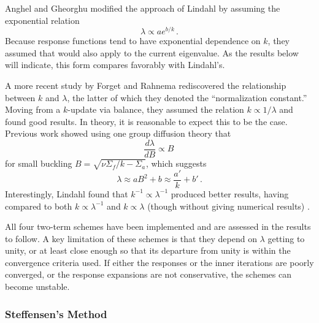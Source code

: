 Anghel and Gheorghu \cite{anghel1987isr}
modified the approach of Lindahl by assuming the 
exponential relation
\begin{equation}
  \lambda \propto a e^{b/k} \, .
\end{equation}
Because response functions tend to have exponential dependence on 
$k$, they assumed that would also apply to the current eigenvalue.  As the
results below will indicate, this form compares favorably with Lindahl's.

A more recent study by Forget and Rahnema \cite{forget2005nee} 
rediscovered the relationship
between $k$ and $\lambda$, the latter of which they denoted
the ``normalization constant.'' 
Moving from a $k$-update via balance, they assumed the relation 
$k \propto 1/\lambda$ and found good results.  In theory, it
is reasonable to expect
this to be the case.  Previous work \cite{roberts2014cer} showed 
using one group diffusion theory that 
\begin{equation}
 \frac{d \lambda}{d B} \propto  B \, 
\end{equation}
for small
buckling $B = \sqrt{\nu \Sigma_f/k - \Sigma_a}$, which
suggests
\begin{equation}
 \lambda \approx  a B^2 + b \approx \frac{a'}{k} + b' \, .
\end{equation}
Interestingly, Lindahl
found that $k^{-1} \propto \lambda^{-1}$ produced better results, having 
compared to both $k \propto \lambda^{-1}$ and $k \propto \lambda$ (though
without giving numerical results) \cite{lindahl1976mdr}.

All four two-term schemes have been implemented and are assessed in 
the results to follow.  A key limitation of these schemes is that they 
depend on $\lambda$ getting to unity, or at least close enough so that
its departure from unity is within the convergence criteria used.  If
either the responses or the inner iterations are poorly converged, or
the response expansions are not conservative, the 
schemes can become unstable.

\subsubsection{Steffensen's Method}
\label{sec:steffensensmethod}

